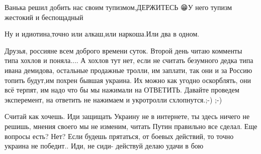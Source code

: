 Ванька решил добить нас своим тупизмом,ДЕРЖИТЕСЬ 😁У него тупизм жестокий и беспощадный 🤗😅

Ну и идиотина,точно или алкаш,или наркоша.Или два в одном.


Друзья, россияне всем доброго времени суток. Второй день читаю комменты типа
хохлов и поняла.... А хохлов тут нет, если не считать безумного дедка типа
ивана демидова, остальные продажные тролли, им заплати, так они и за Россию
топить будут,им похрен бывшая украина. Их можно как угодно оскорблять, они всё
терпят, им надо что бы мы нажимали на ОТВЕТИТЬ. Давайте проведем эксперемент,
на ответить не нажимаем и укротролли схлопнутся.;-) ;-)


Считай как хочешь. Иди защищать Украину не в интернете, ты здесь ничего не
решишь, мнения своего мы не изменим, читать Путин правильно все сделал. Еще
вопросы есть? Нет? Если будешь прятаться, от боевых действий, то точно украина
не победит.. Иди, не сиди- действуй делаю удачи в бою




